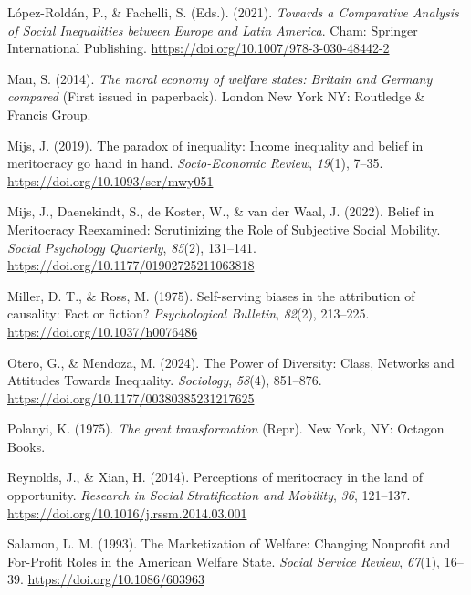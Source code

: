 \documentclass[
  12pt,
]{article}
\newlength{\cslhangindent}
\newenvironment{CSLReferences}[2] %
 {\begin{list}{}{%
  \setlength{\itemindent}{0pt}
  \setlength{\leftmargin}{0pt}
  \setlength{\parsep}{0pt}
  \ifodd #1
   \setlength{\leftmargin}{\cslhangindent}
   \setlength{\itemindent}{-1\cslhangindent}
  \fi
  \setlength{\itemsep}{#2\baselineskip}}}
 {\end{list}}
\begin{document}
\begin{CSLReferences}{1}{0}
López-Roldán, P., \& Fachelli, S. (Eds.). (2021). \emph{Towards a
{Comparative Analysis} of {Social Inequalities} between {Europe} and
{Latin America}}. Cham: Springer International Publishing.
\url{https://doi.org/10.1007/978-3-030-48442-2}

Mau, S. (2014). \emph{The moral economy of welfare states: {Britain} and
{Germany} compared} (First issued in paperback). London New York NY:
Routledge \& Francis Group.

Mijs, J. (2019). The paradox of inequality: Income inequality and belief
in meritocracy go hand in hand. \emph{Socio-Economic Review},
\emph{19}(1), 7--35. \url{https://doi.org/10.1093/ser/mwy051}

Mijs, J., Daenekindt, S., de Koster, W., \& van der Waal, J. (2022).
Belief in {Meritocracy Reexamined}: {Scrutinizing} the {Role} of
{Subjective Social Mobility}. \emph{Social Psychology Quarterly},
\emph{85}(2), 131--141. \url{https://doi.org/10.1177/01902725211063818}

Miller, D. T., \& Ross, M. (1975). Self-serving biases in the
attribution of causality: {Fact} or fiction? \emph{Psychological
Bulletin}, \emph{82}(2), 213--225.
\url{https://doi.org/10.1037/h0076486}

Otero, G., \& Mendoza, M. (2024). The {Power} of {Diversity}: {Class},
{Networks} and {Attitudes Towards Inequality}. \emph{Sociology},
\emph{58}(4), 851--876. \url{https://doi.org/10.1177/00380385231217625}

Polanyi, K. (1975). \emph{The great transformation} (Repr). New York,
NY: Octagon Books.

Reynolds, J., \& Xian, H. (2014). Perceptions of meritocracy in the land
of opportunity. \emph{Research in Social Stratification and Mobility},
\emph{36}, 121--137. \url{https://doi.org/10.1016/j.rssm.2014.03.001}

Salamon, L. M. (1993). The {Marketization} of {Welfare}: {Changing
Nonprofit} and {For-Profit Roles} in the {American Welfare State}.
\emph{Social Service Review}, \emph{67}(1), 16--39.
\url{https://doi.org/10.1086/603963}


\end{CSLReferences}
\end{document}
